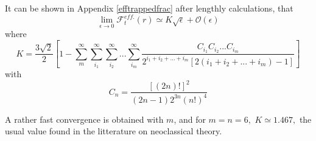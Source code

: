 It can be shown in Appendix \ref{efftrappedfrac} after lengthly
calculations, that
\begin{equation}
\lim_{\epsilon \rightarrow 0}\mathcal{F}_{t}^{eff.}\left( r\right) \simeq K%
\sqrt{\epsilon }+\mathcal{O}\left( \epsilon \right)
\end{equation}
where
\begin{equation}
K=\frac{3\sqrt{2}}{2}\left[ 1-\sum_{m}^{\infty }\sum_{i_{1}}^{\infty
}\sum_{i_{2}}^{\infty }...\sum_{i_{m}}^{\infty }\frac{
C_{i_{1}}C_{i_{2}}...C_{i_{m}}}{2^{i_{1}+i_{2}+...+i_{m}}\left[ 2\left(
i_{1}+i_{2}+...+i_{m}\right) -1\right] }\right]
\end{equation}
with
\begin{equation}
C_{n}=\frac{\left[ \left( 2n\right) !\right] ^{2}}{\left( 2n-1\right)
2^{3n}\left( n!\right) ^{4}}
\end{equation}

A rather fast convergence is obtained with $m$, and for $m=n=6,$ $K\simeq
1.467,$ the usual value found in the litterature on neoclassical theory.
